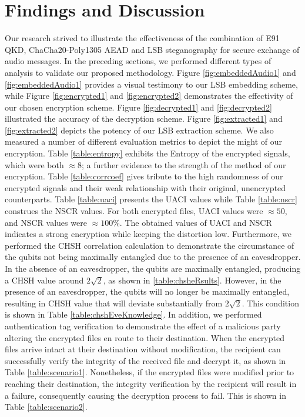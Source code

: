 \documentclass[a4paper]{cas-sc}
\begin{document}
\section{Findings and Discussion}
\label{sec:discussion}
Our research strived to illustrate the effectiveness of the combination of E91 QKD, ChaCha20-Poly1305 AEAD and LSB steganography for secure exchange of audio messages. In the preceding sections, we performed different types of analysis to validate our proposed methodology. Figure \ref{fig:embeddedAudio1} and \ref{fig:embeddedAudio1} provides a visual testimony to our LSB embedding scheme, while Figure \ref{fig:encrypted1} and \ref{fig:encrypted2} demonstrates the effectivity of our chosen encryption scheme. Figure \ref{fig:decrypted1} and \ref{fig:decrypted2} illustrated the accuracy of the decryption scheme. Figure \ref{fig:extracted1} and \ref{fig:extracted2} depicts the potency of our LSB extraction scheme. We also measured a number of different evaluation metrics to depict the might of our encryption. Table \ref{table:entropy} exhibits the Entropy of the encrypted signals, which were both $\approx8$; a further evidence to the strength of the method of our encryption. Table \ref{table:corrcoef} gives tribute to the high randomness of our encrypted signals and their weak relationship with their original, unencrypted counterparts. Table \ref{table:uaci} presents the UACI values while Table \ref{table:nscr} construes the NSCR values. For both encrypted files, UACI values were $\approx50$, and NSCR values were $\approx100\%$. The obtained values of UACI and NSCR indicates a strong encryption while keeping the distortion low. Furthermore, we performed the CHSH correlation calculation to demonstrate the circumstance of the qubits not being maximally entangled due to the presence of an eavesdropper. In the absence of an eavesdropper, the qubits are maximally entangled, producing a CHSH value around $2\sqrt{2}$, as shown in \ref{table:chsheRsults}. However, in the presence of an eavesdropper, the qubits will no longer be maximally entangled, resulting in CHSH value that will deviate substantially from $2\sqrt{2}$. This condition is shown in Table \ref{table:chshEveKnowledge}. In addition, we performed authentication tag verification to demonstrate the effect of a malicious party altering the encrypted files en route to their destination. When the encrypted files arrive intact at their destination without modification, the recipient can successfully verify the integrity of the received file and decrypt it, as shown in Table \ref{table:scenario1}. Nonetheless, if the encrypted files were modified prior to reaching their destination, the integrity verification by the recipient will result in a failure, consequently causing the decryption process to fail. This is shown in Table \ref{table:scenario2}.
\end{document}
